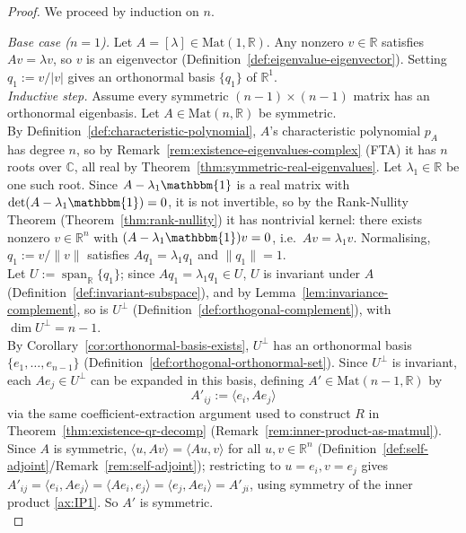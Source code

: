 		\begin{proof}
			We proceed by induction on $n$.
			
			\textit{Base case ($n=1$).} Let $A = [\lambda] \in \mathrm{Mat}(1,\mathbb{R})$. Any nonzero $v \in \mathbb{R}$ satisfies $Av = \lambda v$, so $v$ is an eigenvector (Definition~\ref{def:eigenvalue-eigenvector}). Setting $q_1 := v/|v|$ gives an orthonormal basis $\{q_1\}$ of $\mathbb{R}^1$. \\
			
			\textit{Inductive step.} Assume every symmetric $(n-1)\times(n-1)$ matrix has an orthonormal eigenbasis. Let $A \in \mathrm{Mat}(n,\mathbb{R})$ be symmetric. \\
			
			By Definition~\ref{def:characteristic-polynomial}, $A$'s characteristic polynomial $p_A$ has degree $n$, so by Remark~\ref{rem:existence-eigenvalues-complex} (FTA) it has $n$ roots over $\mathbb{C}$, all real by Theorem~\ref{thm:symmetric-real-eigenvalues}. Let $\lambda_1 \in \mathbb{R}$ be one such root. Since $A - \lambda_1 \mathbbm{1}$ is a real matrix with $\det(A-\lambda_1\mathbbm{1})=0$, it is not invertible, so by the Rank-Nullity Theorem (Theorem~\ref{thm:rank-nullity}) it has nontrivial kernel: there exists nonzero $v \in \mathbb{R}^n$ with $(A-\lambda_1\mathbbm{1})v = 0$, i.e.\ $Av = \lambda_1 v$. Normalising, $q_1 := v/\|v\|$ satisfies $Aq_1 = \lambda_1 q_1$ and $\|q_1\|=1$. \\
			
			Let $U := \operatorname{span}_{\mathbb{R}}\{q_1\}$; since $Aq_1=\lambda_1q_1 \in U$, $U$ is invariant under $A$ (Definition~\ref{def:invariant-subspace}), and by Lemma~\ref{lem:invariance-complement}, so is $U^\perp$ (Definition~\ref{def:orthogonal-complement}), with $\dim U^\perp = n-1$. \\
			
			By Corollary~\ref{cor:orthonormal-basis-exists}, $U^\perp$ has an orthonormal basis $\{e_1,\dots,e_{n-1}\}$ (Definition~\ref{def:orthogonal-orthonormal-set}). Since $U^\perp$ is invariant, each $Ae_j \in U^\perp$ can be expanded in this basis, defining $A' \in \mathrm{Mat}(n-1,\mathbb{R})$ by
			\[
				A'_{ij} := \langle e_i, Ae_j \rangle
			\]
			via the same coefficient-extraction argument used to construct $R$ in Theorem~\ref{thm:existence-qr-decomp} (Remark~\ref{rem:inner-product-as-matmul}). Since $A$ is symmetric, $\langle u,Av\rangle=\langle Au,v\rangle$ for all $u,v\in\mathbb{R}^n$ (Definition~\ref{def:self-adjoint}/Remark~\ref{rem:self-adjoint}); restricting to $u=e_i,v=e_j$ gives $A'_{ij} = \langle e_i,Ae_j\rangle = \langle Ae_i,e_j\rangle = \langle e_j,Ae_i\rangle = A'_{ji}$, using symmetry of the inner product \ref{ax:IP1}. So $A'$ is symmetric. \\
			

\end{proof}
